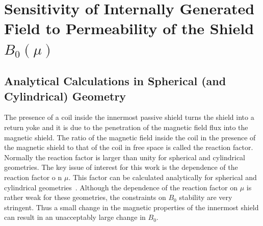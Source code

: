 \section{Sensitivity of Internally Generated Field to Permeability of the Shield $B_0(\mu)$\label{sec:calculation}}

\subsection{Analytical Calculations in Spherical (and Cylindrical) Geometry}


The presence of a coil inside the innermost passive shield turns the
shield into a return yoke and it is due to the penetration of the
magnetic field flux into the magnetic shield.  The ratio of the
magnetic field inside the coil in the presence of the magnetic shield
to that of the coil in free space is called the reaction factor.
Normally the reaction factor is larger than unity for spherical and
cylindrical geometries.  The key issue of interest for this work is
the dependence of the reaction factor o n $\mu$.  This factor can be
calculated analytically for spherical and cylindrical
geometries~\cite{bib:bidinosti,bib:urankar}.  Although the dependence
of the reaction factor on $\mu$ is rather weak for these geometries,
the constraints on $B_0$ stability are very stringent.  Thus a small
change in the magnetic properties of the innermost shield can result
in an unacceptably large change in $B_0$.

